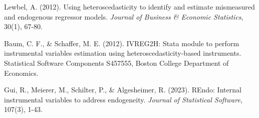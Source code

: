 \documentclass[12pt]{article}
\begin{document}
Lewbel, A. (2012). Using heteroscedasticity to identify and estimate mismeasured and endogenous regressor models. \textit{Journal of Business \& Economic Statistics}, 30(1), 67-80.

Baum, C. F., \& Schaffer, M. E. (2012). IVREG2H: Stata module to perform instrumental variables estimation using heteroscedasticity-based instruments. Statistical Software Components S457555, Boston College Department of Economics.

Gui, R., Meierer, M., Schilter, P., \& Algesheimer, R. (2023). REndo: Internal instrumental variables to address endogeneity. \textit{Journal of Statistical Software}, 107(3), 1-43.
\end{document}
